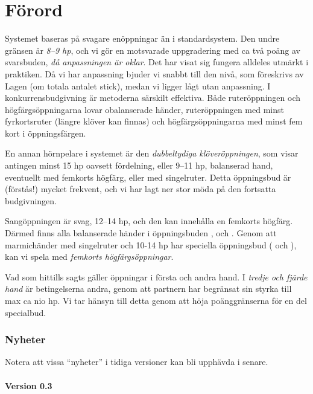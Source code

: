 \chapter*{F\"orord}


Systemet  baseras på svagare
en\-öpp\-ning\-ar än i standardsystem. Den undre gränsen är {\em 8--9
hp}, och vi gör en motsvarade uppgradering med ca två poäng av
svarsbuden, {\em då anpassningen är oklar}. Det har visat sig fungera
alldeles utmärkt i praktiken. Då vi har anpassning bjuder vi snabbt till
den nivå, som föreskrivs av {\sc Lagen} (om totala antalet stick), medan
vi ligger lågt utan anpassning. I konkurrensbudgivning är metoderna särskilt
effektiva. Både ruteröppningen och högfärgsöppningarna lovar obalanserade
händer, ruteröppningen med minst fyrkortsruter (längre klöver kan finnas)
och högfärgsöppningarna med minst fem kort i öppningsfärgen.

En annan hörnpelare i systemet är den {\em dubbeltydiga klöveröppningen},
som visar antingen minst 15 hp oavsett fördelning, eller 9--11 hp,
balanserad hand, eventuellt med femkorts högfärg, eller \marmic med
singelruter. Detta öppningsbud är (förstås!) 
mycket frekvent, och vi har lagt ner stor möda på den fortsatta
budgivningen.

Sangöppningen är svag, 12--14 hp, och den kan innehålla en femkorts
högfärg. Därmed finns alla balanserade händer i 
öppningsbuden ,  och .
Genom att marmichänder med singelruter och 10-14 hp har speciella
öppningsbud ( och ), kan vi spela med {\em
femkorts högfärgsöppningar}.

Vad som hittills sagts gäller öppningar i första och andra hand. I {\em tredje
och fjärde hand} är betingelserna andra, genom att partnern har
begränsat sin styrka till max ca nio hp. Vi tar hänsyn till detta genom att
höja poänggränserna för en del specialbud.

\subsection{Nyheter}

Notera att vissa ``nyheter'' i tidiga versioner kan bli upphävda i senare.
\subsubsection*{Version 0.3}


